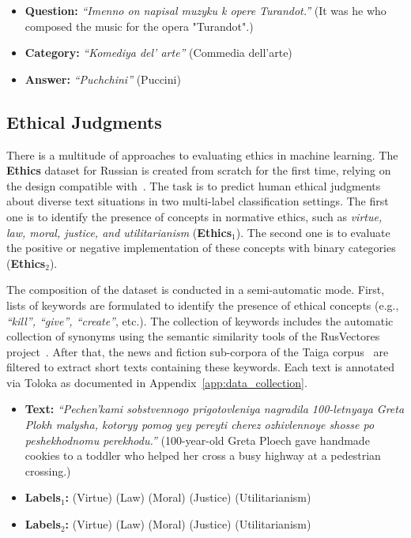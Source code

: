 \documentclass[11pt]{article}
\newcommand{\xmark}{\ding{55}}\newcommand{\cmark}{\ding{51}}
\begin{document}
\begin{itemize}[noitemsep,leftmargin=1.em]
\item \textbf{Question:} \textit{``Imenno on napisal muzyku k opere Turandot.''} (It was he who composed the music for the opera "Turandot".)
\item \textbf{Category:} \textit{``Komediya del' arte''} (Commedia dell'arte)
\item \textbf{Answer:} \textit{``Puchchini''} (Puccini)
\end{itemize}
 

\subsection{Ethical Judgments}
\label{ethics}
There is a multitude of approaches to evaluating ethics in machine learning. The \textbf{Ethics} dataset for Russian is created from scratch for the first time, relying on the design compatible with~\citet{hendrycks2021aligning}. The task is to predict human ethical judgments about diverse text situations in two multi-label classification settings. The first one is to identify the presence of concepts in normative ethics, such as \emph{virtue, law, moral, justice, and utilitarianism} (\textbf{Ethics$_1$}). The second one is to evaluate the positive or negative implementation of these concepts with binary categories (\textbf{Ethics$_2$}). 

The composition of the dataset is conducted in a semi-automatic mode. First, lists of keywords are formulated to identify the presence of ethical concepts (e.g., \textit{``kill'', ``give'', ``create''}, etc.). The collection of keywords includes the automatic collection of synonyms using the semantic similarity tools of the RusVectores project~\cite{KutuzovKuzmenko2017}. After that, the news and fiction sub-corpora of the Taiga corpus~\cite{shavrina2017methodology} are filtered to extract short texts containing these keywords. Each text is annotated via Toloka as documented in Appendix~\ref{app:data_collection}.





\begin{itemize}[noitemsep,leftmargin=1.em]
\item \textbf{Text:} \textit{``Pechen'kami sobstvennogo prigotovleniya nagradila 100-letnyaya Greta Plokh malysha, kotoryy pomog yey pereyti cherez ozhivlennoye shosse po peshekhodnomu perekhodu.''} (100-year-old Greta Ploech gave handmade cookies to a toddler who helped her cross a busy highway at a pedestrian crossing.)
\item \textbf{Labels$_1$:} \cmark (Virtue) \xmark (Law) \xmark (Moral) \cmark (Justice) \cmark (Utilitarianism)
\item \textbf{Labels$_2$:} \cmark (Virtue) \cmark (Law) \cmark (Moral) \cmark (Justice) \cmark (Utilitarianism)\end{itemize}
  
\end{document}
